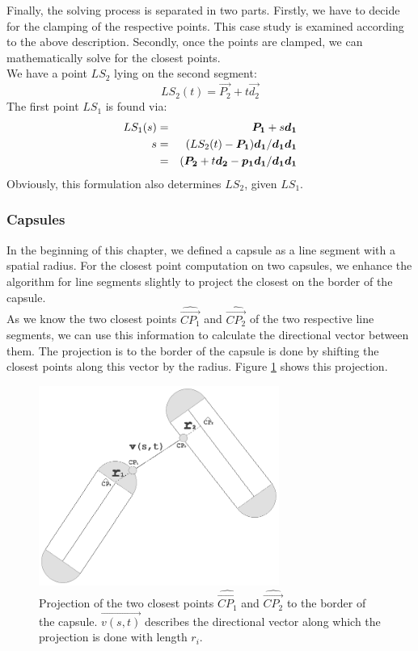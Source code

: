 Finally, the solving process is separated in two parts. Firstly, we have to decide for the clamping of the respective points. This case study is examined according to the above description. Secondly, once the points are clamped, we can mathematically solve for the closest points.\\
We have a point $LS_2$ lying on the second segment:
\begin{equation}
LS_2(t) = \vec{P_2} + t\vec{d_2}
\end{equation}
The first point $LS_1$ is found via:
\begin{eqnarray}
LS_1(s) &=& \vec{P_1} + s\vec{d_1} \notag \\
s &=& (LS_2(t) -  \vec{P_1})\vec{d_1} / \vec{d_1}\vec{d_1} \notag \\
  &=& (\vec{P_2}+ t\vec{d_2}-\vec{p_1}\vec{d_1}/ \vec{d_1}\vec{d_1}
\end{eqnarray}
Obviously, this formulation also determines $LS_2$, given $LS_1$.

\subsubsection*{Capsules}
In the beginning of this chapter, we defined a capsule as a line segment with a spatial radius. For the closest point computation on two capsules, we enhance the algorithm for line segments slightly to project the closest on the border of the capsule.\\
As we know the two closest points $\hat{\vec{CP_1}}$ and $\hat{\vec{CP_2}}$ of the two respective line segments, we can use this information to calculate the directional vector between them. The projection is to the border of the capsule is done by shifting the closest points along this vector by the radius. Figure \ref{fig:capsulevec} shows this projection.
\begin{figure}[h!]
  \centering
    \includegraphics[width=0.7\textwidth]{../figures/capsulecapsule_vector.eps}
    \caption{Projection of the two closest points $\hat{\vec{CP_1}}$ and $\hat{\vec{CP_2}}$ to the border of the capsule. $\vec{v(s,t)}$ describes the directional vector along which the projection is done with length $r_i$.}
    \label{fig:capsulevec}
\end{figure}

